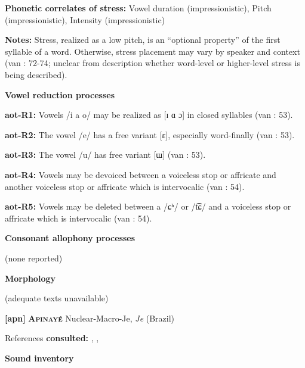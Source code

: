 \textbf{Phonetic correlates of stress:} Vowel duration (impressionistic), Pitch (impressionistic), Intensity (impressionistic)



\textbf{Notes:} Stress, realized as a low pitch, is an “optional property” of the first syllable of a word. Otherwise, stress placement may vary by speaker and context (van \citealt{Breugel2008}: 72-74; unclear from description whether word-level or higher-level stress is being described).



\textbf{Vowel reduction processes}



\textbf{aot-R1:} Vowels /i a o/ may be realized as [ɪ ɑ ɔ] in closed syllables (van \citealt{Breugel2008}: 53).



\textbf{aot-R2:} The vowel /e/ has a free variant [ɛ], especially word-finally (van \citealt{Breugel2008}: 53).



\textbf{aot-R3:} The vowel /u/ has free variant [ɯ] (van \citealt{Breugel2008}: 53).



\textbf{aot-R4:} Vowels may be devoiced between a voiceless stop or affricate and another voiceless stop or affricate which is intervocalic (van \citealt{Breugel2008}: 54).



\textbf{aot-R5:} Vowels may be deleted between a /ɕʰ/ or /t͡ɕ/ and a voiceless stop or affricate which is intervocalic (van \citealt{Breugel2008}: 54).



\textbf{Consonant allophony processes}



(none reported)



\textbf{Morphology}



(adequate texts unavailable)



\textbf{[apn]}   \textbf{\textsc{Apinayé}}  Nuclear-Macro-Je, \textit{Je} (Brazil)



References \textbf{consulted:} \citet{BurgessHam1968}, \citet{Ham2009},  \citet{CunhadeOliveira2005}



\textbf{Sound inventory}




